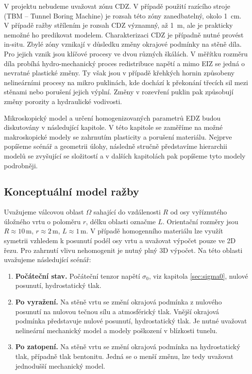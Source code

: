 \documentclass{article}
\begin{document}
V projektu nebudeme uvažovat zónu CDZ. V případě použití razícího stroje (TBM -- Tunnel Boring Machine) je rozsah této zóny zanedbatelný, okolo 1~cm. V případě 
ražby střílením je rozsah CDZ významný, až 1~m, ale je prakticky nemožné ho predikovat modelem. Charakterizaci CDZ je případně nutné provést in-situ.
Zbylé zóny vznikají v důsledku změny okrajové podmínky na stěně díla. Pro jejich vznik jsou klíčové procesy ve dvou různých škálách. V měřítku rozměru 
díla probíhá hydro-mechanický proces redistribuce napětí a mimo EIZ se jedná o nevratné plastické změny. Ty však jsou v případě křehkých hornin
způsobeny nelineárními procesy na mikro puklinách, kde dochází k překonání třecích sil mezi stěnami nebo porušení jejich výplní. 
Změny v rozevření puklin pak způsobují změny porozity a hydraulické vodivosti. 

Mikroskopický model a určení homogenizovaných parametrů EDZ budou diskutovány v následující kapitole.
V této kapitole se zaměříme na možné makroskopické modely se zahrnutím plasticity a porušení materiálu.
Nejprve popíšeme scénář a geometrii úlohy, následně stručně představíme hierarchii modelů se zvyšující se složitostí
a v dalších kapitolách pak popíšeme tyto modely podrobněji.

\subsection{Konceptuální model ražby}
Uvažujeme válcovou oblast $\Omega$ sahající do vzdálenosti $R$ od osy vyříznutého úložného vrtu o poloměru $r$, délku oblasti označme $L$. Orientační rozměry jsou $R\approx 10\,\mathrm{m}$, $r\approx 2\,\mathrm{m}$, $L\approx 1\,\mathrm{m}$. V případě homogenního materiálu lze využít symetrii vzhledem k posunutí podél osy vrtu a uvažovat výpočet pouze ve 2D řezu. Pro zahrnutí vlivu nehomogenit je nutný plný 3D výpočet. Na této oblasti uvažujeme následující scénář:

\begin{enumerate}
\item {\bf Počáteční stav.} Počáteční tenzor napětí $\sigma_0$, viz kapitola \ref{sec:sigma0}, nulové posunutí, hydrostatický tlak.
                       
\item {\bf Po vyražení.} Na stěně vrtu se změní okrajová podmínka z nulového posunutí na nulovou tečnou sílu a 
                         atmosférický tlak. Vnější okrajová podmínka představuje nulové posunutí, hydrostatický tlak.
                         Je nutné uvažovat nelineární mechanický model a modely poškození v blízkosti tunelu.                    
                         
\item {\bf Po zatopení.} Na stěně vrtu se změní okrajová podmínka na hydrostatický tlak, případně tlak bentonitu. 
                        Jedná se o menší změnu, lze tedy uvažovat jednodušší mechanický model.
\end{enumerate}
\end{document}
